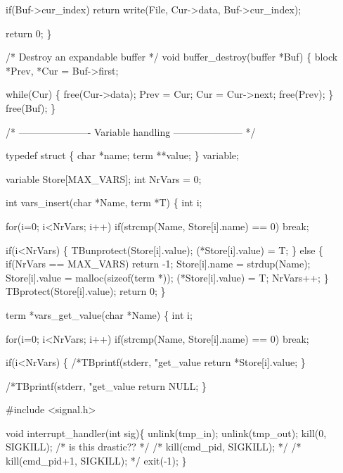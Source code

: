   if(Buf->cur_index)
    return write(File, Cur->data, Buf->cur_index);

  return 0;
\}

/* Destroy an expandable buffer */
void buffer_destroy(buffer *Buf)
\{
  block *Prev, *Cur = Buf->first;

  while(Cur)
    \{
      free(Cur->data);
      Prev = Cur;
      Cur = Cur->next;
      free(Prev);
    \}
  free(Buf);
\}

/* ---------------------- Variable handling --------------------- */

typedef struct
\{
  char *name;
  term **value;
\} variable;

variable Store[MAX_VARS];
int NrVars = 0;

int vars_insert(char *Name, term *T)
\{
  int i;

  for(i=0; i<NrVars; i++)
    if(strcmp(Name, Store[i].name) == 0)
      break;

  if(i<NrVars)
    \{
      TBunprotect(Store[i].value);
      (*Store[i].value) = T;
    \}
  else
    \{
      if(NrVars == MAX_VARS)
        return -1;
      Store[i].name = strdup(Name);
      Store[i].value = malloc(sizeof(term *));
      (*Store[i].value) = T;
      NrVars++;
    \}
  TBprotect(Store[i].value);
  return 0;
\}

term *vars_get_value(char *Name)
\{
  int i;

  for(i=0; i<NrVars; i++)
    if(strcmp(Name, Store[i].name) == 0)
      break;

  if(i<NrVars)
    \{
      /*TBprintf(stderr, "get_value %
      return *Store[i].value;
    \}

  /*TBprintf(stderr, "get_value %
  return NULL;
\}

#include <signal.h>

void interrupt_handler(int sig)\{
  unlink(tmp_in);
  unlink(tmp_out);
  kill(0, SIGKILL);  /* is this drastic?? */
/*  kill(cmd_pid, SIGKILL); */
/*  kill(cmd_pid+1, SIGKILL); */
  exit(-1);
\}

